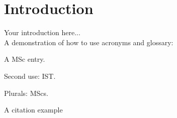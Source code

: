 
\chapter{Introduction}
\label{chapter:introduction}
Your introduction here...\\

A demonstration of how to use acronyms and glossary:

A \gls{MSc} entry.

Second use: \gls{IST}.

Plurals: \glspl{MSc}.

A citation example \cite{nobody}